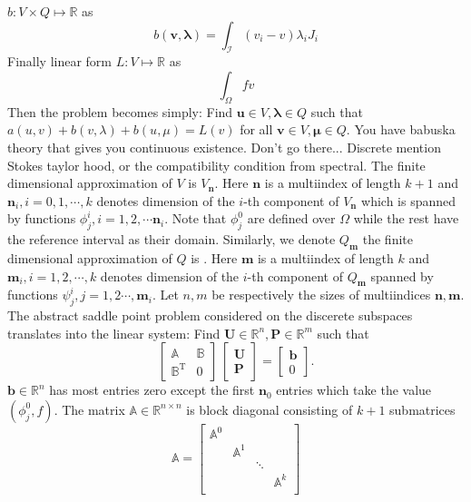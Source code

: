\documentclass{marine_2015}
\newcommand{\Amat}{\ensuremath{\mathbb{A}}}
\newcommand{\inner}[2]{\ensuremath{\left(#1, #2\right)}}
\newcommand{\ainner}[2]{\ensuremath{a\left(#1, #2\right)}}
\newcommand{\binner}[2]{\ensuremath{b\left(#1, #2\right)}}
\newcommand{\Linner}[1]{\ensuremath{L\left(#1\right)}}
\newcommand{\Vh}{\ensuremath{V_{\mathbf{n}}}}
\newcommand{\Qh}{\ensuremath{Q_{\mathbf{m}}}}
\newcommand{\vvec}[1]{\ensuremath{\pmb{#1}}}
\begin{document}
$b:V\times Q\mapsto\mathbb{R}$ as
\[
  \binner{\vvec{v}}{\vvec{\lambda}} = 
  \int_{\mathcal{I}}\left(v_i-v\right)\lambda_i J_i
\]
Finally linear form
$L:V\mapsto\mathbb{R}$ as
\[
  \displaystyle\int_{\Omega}f v
\]
Then the problem becomes simply: Find $\vvec{u}\in V, \vvec{\lambda}\in Q$ such
that $\ainner{u}{v}+\binner{v}{\lambda}+\binner{u}{\mu}=\Linner{v}$ for all 
$\vvec{v}\in V, \vvec{\mu}\in Q$. You have babuska theory that gives you
continuous existence. Don't go there... Discrete mention Stokes taylor hood, or
the compatibility condition from spectral.
The finite dimensional approximation of $V$ is $\Vh$. Here $\mathbf{n}$ is a
multiindex of length $k+1$ and $\mathbf{n}_i, i=0, 1,\cdots, k$ denotes dimension
of the $i$-th component of $\Vh$ which is spanned by functions $\phi^i_j,
i=1,2,\cdots\mathbf{n}_i$. Note that $\phi^0_j$ are defined over $\Omega$ while
the rest have the reference interval as their domain. Similarly, we denote $\Qh$ 
the finite dimensional approximation of $Q$ is . Here $\mathbf{m}$ is a multiindex
of length $k$ and $\mathbf{m}_i, i=1, 2, \cdots, k$ denotes dimension of the 
$i$-th component of $\Qh$ spanned by functions $\psi^i_j, j=1,
2\cdots,\mathbf{m}_i$.
Let $n, m$ be respectively the sizes of multiindices $\mathbf{n}, \mathbf{m}$.
The abstract saddle point problem considered on the discerete subspaces
translates into the linear system: Find $\mathbf{U}\in\mathbb{R}^n,
\mathbf{P}\in\mathbb{R}^m$ such that
\[
    \begin{bmatrix}
      \mathbb{A} & \mathbb{B} \\
      \mathbb{B}^{\text{T}} & 0
    \end{bmatrix}
    \,
    \begin{bmatrix}
      \mathbf{U} \\
      \mathbf{P}
    \end{bmatrix}
    =
    \begin{bmatrix}
      \mathbf{b}\\
      0
    \end{bmatrix}.
\]
$\mathbf{b}\in\mathbb{R}^n$ has most entries zero except the first $\mathbf{n}_0$
entries which take the value $\inner{\phi^0_j}{f}$. The matrix
$\Amat\in\mathbb{R}^{n\times n}$ is block diagonal consisting of $k+1$
submatrices
\[
    \mathbb{A}=
    \begin{bmatrix}
      \mathbb{A}^0  &   &  &\\
                    & \mathbb{A}^1 &  &\\
                    &   &   \ddots    & \\
                    &   &   & \mathbb{A}^k\\
    \end{bmatrix}
\]
\end{document}
